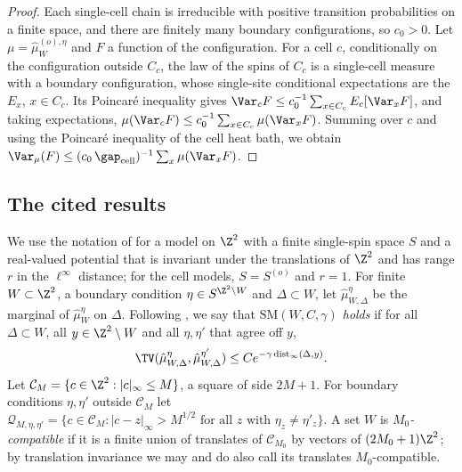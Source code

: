 \begin{proof}
Each single-cell chain is irreducible with positive transition probabilities on a finite space, and there are finitely many boundary configurations, so $c_0 > 0$. Let $\mu = \hat\mu^{(o), \eta}_W$ and $F$ a function of the configuration. For a cell $c$, conditionally on the configuration outside $C_c$, the law of the spins of $C_c$ is a single-cell measure with a boundary configuration, whose single-site conditional expectations are the $E_x$, $x \in C_c$. Its Poincar\'e inequality gives $\Var_c F \le c_0^{-1} \sum_{x \in C_c} E_c [\Var_x F]$, and taking expectations, $\mu(\Var_c F) \le c_0^{-1} \sum_{x \in C_c} \mu(\Var_x F)$. Summing over $c$ and using the Poincar\'e inequality of the cell heat bath, we obtain $\Var_\mu(F) \le (c_0 \, \gap_{\mathrm{cell}})^{-1} \sum_{x} \mu(\Var_x F)$.
\end{proof}

\subsection{The cited results}\label{s:cited}

We use the notation of \cite{MOS94} for a model on $\Z^2$ with a finite single-spin space $S$ and a real-valued potential that is invariant under the translations of $\Z^2$ and has range $r$ in the $\ell^\infty$ distance; for the cell models, $S = S^{(o)}$ and $r = 1$. For finite $W \subset \Z^2$, a boundary condition $\eta \in S^{\Z^2 \setminus W}$ and $\Delta \subset W$, let $\hat\mu^\eta_{W, \Delta}$ be the marginal of $\hat\mu^\eta_W$ on $\Delta$. Following \cite[(1.10)]{MOS94}, we say that \emph{$\mathrm{SM}(W, C, \gamma)$ holds} if for all $\Delta \subset W$, all $y \in \Z^2 \setminus W$ and all $\eta, \eta'$ that agree off $y$,
\begin{equation}\label{e:SM}
\TV(\hat\mu^\eta_{W, \Delta}, \hat\mu^{\eta'}_{W, \Delta}) \le C e^{-\gamma \operatorname{dist}_\infty(\Delta, y)} .
\end{equation}
Let $\mathcal C_M = \{ c \in \Z^2 : |c|_\infty \le M\}$, a square of side $2M + 1$. For boundary conditions $\eta, \eta'$ outside $\mathcal C_M$ let $\mathcal Q_{M, \eta, \eta'} = \{ c \in \mathcal C_M : |c - z|_\infty > M^{1/2} \text{ for all } z \text{ with } \eta_z \neq \eta'_z \}$. A set $W$ is \emph{$M_0$-compatible} if it is a finite union of translates of $\mathcal C_{M_0}$ by vectors of $(2 M_0 + 1) \Z^2$; by translation invariance we may and do also call its translates $M_0$-compatible.

